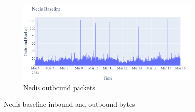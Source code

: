 \begin{figure}[H]
\begin{subfigure}[b]{0.4\textwidth}
    \end{subfigure}
    \begin{subfigure}[b]{0.4\textwidth}
        \includegraphics[width=\textwidth]{figures/Nedis_Baseline_OutboundPackets.png}
        \caption{Nedis outbound packets}
    \end{subfigure}
    \caption{Nedis baseline inbound and outbound bytes}
    \label{Fig:NedisBaselineOutandInboundTraffic}
 \end{figure}
 
